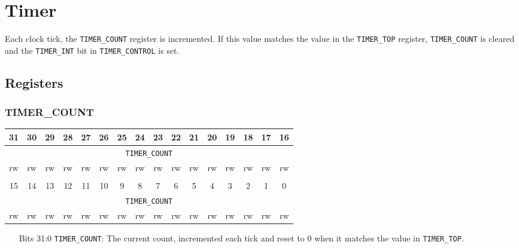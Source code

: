 \documentclass[11pt,openany]{report}
\begin{document}
\section{Timer}
Each clock tick, the \verb|TIMER_COUNT| register is incremented. If
this value matches the value in the \verb|TIMER_TOP| register,
\verb|TIMER_COUNT| is cleared and the \verb|TIMER_INT| bit in
\verb|TIMER_CONTROL| is set.

\subsection{Registers}
\subsubsection{TIMER\_COUNT}

\begin{center}
  \begin{tabular}{|c|c|c|c|c|c|c|c|c|c|c|c|c|c|c|c|}
    \hline
    31 & 30 & 29 & 28 & 27 & 26 & 25 & 24 & 23 & 22 & 21 & 20 & 19 & 18 & 17 & 16 \\
    \hline
    \multicolumn{16}{|c|}{\texttt{TIMER\_COUNT}}\\
    \hline
    rw & rw & rw & rw & rw & rw & rw & rw & rw & rw & rw & rw & rw & rw & rw & rw\\
    \hline
    \multicolumn{16}{c}{}\\
    \hline
    15 & 14 & 13 & 12 & 11 & 10 & 9 & 8 & 7 & 6 & 5 & 4 & 3 & 2 & 1 & 0 \\
    \hline
    \multicolumn{16}{|c|}{\texttt{TIMER\_COUNT}}\\
    \hline
    rw & rw & rw & rw & rw & rw & rw & rw & rw & rw & rw & rw & rw & rw & rw & rw\\
    \hline
  \end{tabular}
\end{center}

\begin{enumerate}
\item[Bits 31:0] \verb|TIMER_COUNT|: The current count, incremented
  each tick and reset to 0 when it matches the value in
  \verb|TIMER_TOP|.
\end{enumerate}
\end{document}
